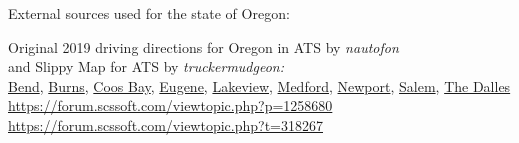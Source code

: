 
















\vspace{2em}\footnoterule
{\footnotesize \noindent External sources used for the state of Oregon:
\begin{description}[
style=nextline,
leftmargin=1.1em,
labelsep=0pt,
parsep=0pt,
font=\normalfont,
]

\item[$\ast$]
Original 2019 driving directions for Oregon in ATS by \textit{nautofon}\\ and Slippy Map for ATS by \textit{truckermudgeon:}\\
\hyperref[city:Bend]{Bend},
\hyperref[city:Burns]{Burns},
\hyperref[city:Coos Bay]{Coos Bay},
\hyperref[city:Eugene]{Eugene},
\hyperref[city:Lakeview]{Lakeview},
\hyperref[city:Medford]{Medford},
\hyperref[city:Newport]{Newport},
\hyperref[city:Salem]{Salem},
\hyperref[city:The Dalles]{The Dalles}
\\ \url{https://forum.scssoft.com/viewtopic.php?p=1258680}
\\ \url{https://forum.scssoft.com/viewtopic.php?t=318267}

\end{description}
}
